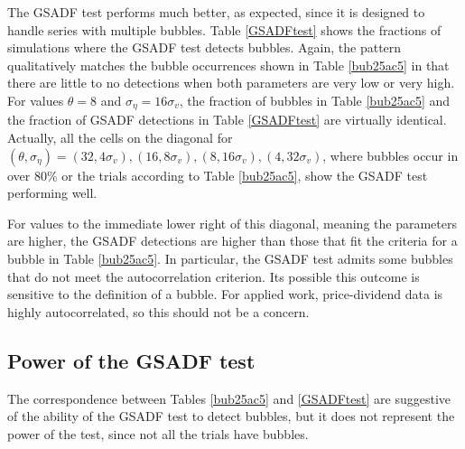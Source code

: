 \documentclass[12pt]{article}
\begin{document}
The GSADF test performs much better, as expected, since it is designed to handle series with multiple bubbles. Table \ref{GSADFtest} shows the fractions of simulations where the GSADF test detects bubbles. Again, the pattern qualitatively matches the bubble occurrences shown in Table \ref{bub25ac5} in that there are little to no detections when both parameters are very low or very high. For values $\theta=8$ and $\sigma_{\eta} =16\sigma_{v}$, the fraction of bubbles in Table \ref{bub25ac5} and the fraction of GSADF detections in Table \ref{GSADFtest} are virtually identical. Actually, all the cells on the diagonal for $(\theta,\sigma_{\eta})=(32,4\sigma_{v}),(16,8\sigma_{v}),(8,16\sigma_{v}),(4,32\sigma_{v})$, where bubbles occur in over 80\% or the trials according to Table \ref{bub25ac5}, show the GSADF test performing well.

For values to the immediate lower right of this diagonal, meaning the parameters are higher, the GSADF detections are higher than those that fit the criteria for a bubble in Table \ref{bub25ac5}. In particular, the GSADF test admits some bubbles that do not meet the autocorrelation criterion. Its possible this outcome is sensitive to the definition of a bubble. For applied work, price-dividend data is highly autocorrelated, so this should not be a concern.

\subsection{Power of the GSADF test}

The correspondence between Tables \ref{bub25ac5} and \ref{GSADFtest} are suggestive of the ability of the GSADF test to detect bubbles, but it does not represent the power of the test, since not all the trials have bubbles.
\end{document}
